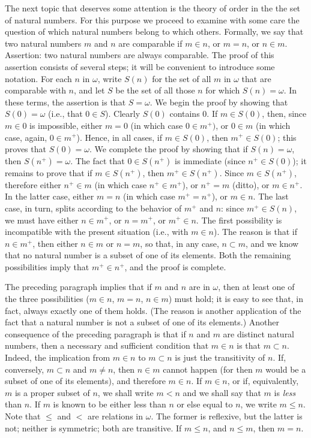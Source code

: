 The next topic that deserves some attention is the theory of order in the the set of natural numbers. For this purpose we proceed to examine with some care the question of which natural numbers belong to which others. Formally, we say that two natural numbers $m$ and $n$ are comparable if $m \in n$, or $m = n$, or $n \in m$. Assertion: two natural numbers are always comparable. The proof of this assertion consists of several steps; it will be convenient to introduce some notation. For each $n$ in $\omega$, write $S(n)$ for the set of all $m$ in $\omega$ that are comparable with $n$, and let $S$ be the set of all those $n$ for which $S(n) = \omega$. In these terms, the assertion is that $S = \omega$. We begin the proof by showing that $S(0) = \omega$ (i.e., that $0 \in S$). Clearly $S(0)$ contains $0$. If $m \in S(0)$, then, since $m \in 0$ is impossible, either $m = 0$ (in which case $0 \in m^{+})$, or $0 \in m$ (in which case, again, $0 \in m^{+}$). Hence, in all cases, if $m \in S(0)$, then $m^{+} \in S(0)$; this proves that $S(0) = \omega$. We complete the proof by showing that if $S(n) = \omega$, then $S(n^{+}) = \omega$. The fact that $0 \in S(n^{+})$ is immediate (since $n^{+} \in S(0)$); it remains to prove that if $m \in S(n^{+})$, then $m^{+} \in S(n^{+})$. Since $m \in S(n^{+})$, therefore either $n^{+} \in m$ (in which case $n^{+} \in m^{+}$), or $n^{+} = m$ (ditto), or $m \in n^{+}$. In the latter case, either $m = n$ (in which case $m^{+} = n^{+}$), or $m \in n$. The last case, in turn, splits according to the behavior of $m^{+}$ and $n$: since $m^{+} \in S(n)$, we must have either $n \in m^{+}$, or $n = m^{+}$, or $m^{+} \in n$. The first possibility is incompatible with the present situation (i.e., with $m \in n$). The reason is that if $n \in m^{+}$, then either $n \in m$ or $n = m$, so that, in any case, $n \subset m$, and we know that no natural number is a subset of one of its elements. Both the remaining possibilities imply that $m^{+} \in n^{+}$, and the proof is complete. 

The preceding paragraph implies that if $m$ and $n$ are in $\omega$, then at least one of the three possibilities ($m \in n$, $m = n$, $n \in m$) must hold; it is easy to see that, in fact, always exactly one of them holds. (The reason is another application of the fact that a natural number is not a subset of one of its elements.) Another consequence of the preceding paragraph is that if $n$ and $m$ are distinct natural numbers, then a necessary and sufficient condition that $m \in n$ is that $m \subset n$. Indeed, the implication from $m \in n$ to $m \subset n$ is just the transitivity of $n$. If, conversely, $m \subset n$ and $m \neq n$, then $n \in m$ cannot happen (for then $m$ would be a subset of one of its elements), and therefore $m \in n$. If $m \in n$, or if, equivalently, $m$ is a proper subset of $n$, we shall write $m < n$ and we shall say that $m$ is \textit{less} than $n$. If $m$ is known to be either less than $n$ or else equal to $n$, we write $m \le n$. Note that $\le$ and $<$ are relations in $\omega$. The former is reflexive, but the latter is not; neither is symmetric; both are transitive. If $m \le n$, and $n \le m$, then $m = n$.

